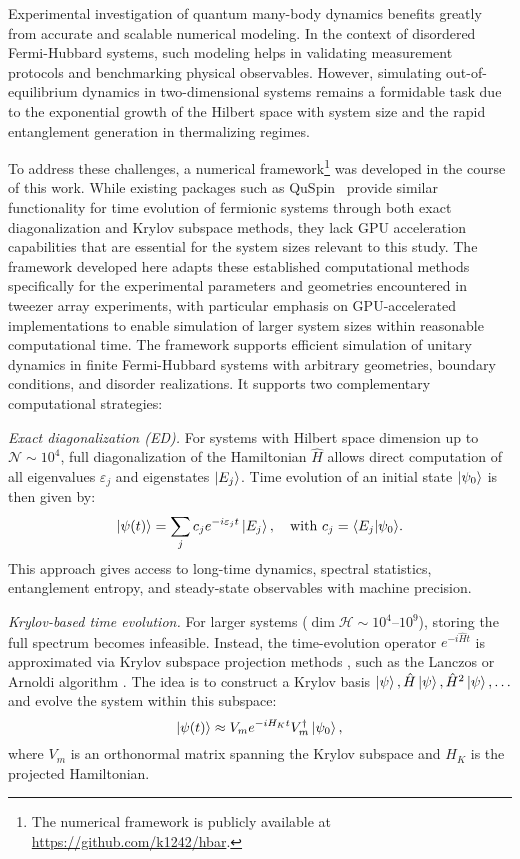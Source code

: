 
Experimental investigation of quantum many-body dynamics benefits greatly from accurate and scalable numerical modeling. In the context of disordered Fermi-Hubbard systems, such modeling helps in validating measurement protocols and benchmarking physical observables. However, simulating out-of-equilibrium dynamics in two-dimensional systems remains a formidable task due to the exponential growth of the Hilbert space with system size and the rapid entanglement generation in thermalizing regimes.

To address these challenges, a numerical framework\footnote{
	The numerical framework is publicly available at \url{https://github.com/k1242/hbar}.
} was developed in the course of this work. While existing packages such as QuSpin~\cite{weinberg_quspin_2019} provide similar functionality for time evolution of fermionic systems through both exact diagonalization and Krylov subspace methods, they lack GPU acceleration capabilities that are essential for the system sizes relevant to this study. The framework developed here adapts these established computational methods specifically for the experimental parameters and geometries encountered in tweezer array experiments, with particular emphasis on GPU-accelerated implementations to enable simulation of larger system sizes within reasonable computational time.
The framework supports efficient simulation of unitary dynamics in finite Fermi-Hubbard systems with arbitrary geometries, boundary conditions, and disorder realizations. It supports two complementary computational strategies:

\textit{Exact diagonalization (ED).}
For systems with Hilbert space dimension up to $\mathcal{N} \sim 10^4$, full diagonalization of the Hamiltonian $\hat{H}$ allows direct computation of all eigenvalues ${\varepsilon_j}$ and eigenstates ${\left| E_j \right\rangle}$. Time evolution of an initial state $\left| \psi_0 \right\rangle$ is then given by:
\begin{equation}
\ket{\psi(t)} = \sum_j c_j e^{-i \varepsilon_j t} \ket{E_j}, \quad \text{with } c_j = \bk{E_j}{\psi_0}.
\end{equation}
This approach gives access to long-time dynamics, spectral statistics, entanglement entropy, and steady-state observables with machine precision. 

\textit{Krylov-based time evolution.}
For larger systems ($\dim \mathcal{H} \sim 10^4$–$10^9$), storing the full spectrum becomes infeasible. Instead, the time-evolution operator $e^{-i \hat{H} t}$ is approximated via Krylov subspace projection methods \cite{weinberg_quspin_2019}, such as the Lanczos or Arnoldi algorithm \cite{saad_analysis_1992,hochbruck_krylov_1997}. The idea is to construct a Krylov basis ${ \left| \psi \right\rangle, \hat{H} \left| \psi \right\rangle, \hat{H}^2 \left| \psi \right\rangle, \ldots }$ and evolve the system within this subspace:
\begin{equation}
\left| \psi(t) \right\rangle \approx V_m e^{-i H_K t} V_m^\dagger \left| \psi_0 \right\rangle,
\end{equation}
where $V_m$ is an orthonormal matrix spanning the Krylov subspace and $H_K$ is the projected Hamiltonian. 

